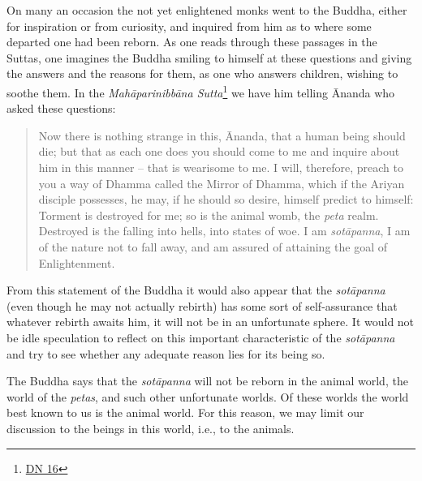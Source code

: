 On many an occasion the not yet enlightened monks went to the Buddha, either for inspiration or from curiosity, and inquired from him as to where some departed one had been reborn. As one reads through these passages in the Suttas, one imagines the Buddha smiling to himself at these questions and giving the answers and the reasons for them, as one who answers children, wishing to soothe them. In the \emph{Mahāparinibbāna Sutta}\footnote{\href{https://suttacentral.net/dn16/en/bodhi}{DN 16}} we have him telling Ānanda who asked these questions:

\begin{quote}
Now there is nothing strange in this, Ānanda, that a human being should die; but that as each one does you should come to me and inquire about him in this manner -- that is wearisome to me. I will, therefore, preach to you a way of Dhamma called the Mirror of Dhamma, which if the Ariyan disciple possesses, he may, if he should so desire, himself predict to himself: Torment is destroyed for me; so is the animal womb, the \emph{peta} realm. Destroyed is the falling into hells, into states of woe. I am \emph{sotāpanna}, I am of the nature not to fall away, and am assured of attaining the goal of Enlightenment.
\end{quote}

From this statement of the Buddha it would also appear that the \emph{sotāpanna} (even though he may not actually  rebirth) has some sort of self-assurance that whatever rebirth awaits him, it will not be in an unfortunate sphere. It would not be idle speculation to reflect on this important characteristic of the \emph{sotāpanna} and try to see whether any adequate reason lies for its being so.

The Buddha says that the \emph{sotāpanna} will not be reborn in the animal world, the world of the \emph{petas}, and such other unfortunate worlds. Of these worlds the world best known to us is the animal world. For this reason, we may limit our discussion to the beings in this world, i.e., to the animals.


